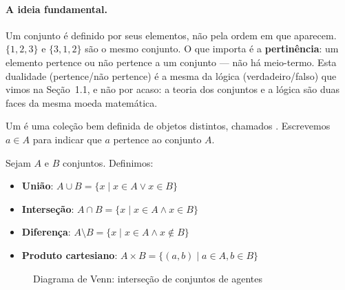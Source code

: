 \paragraph{A ideia fundamental.} Um conjunto é definido por seus elementos,
não pela ordem em que aparecem. $\{1, 2, 3\}$ e $\{3, 1, 2\}$ são o mesmo
conjunto. O que importa é a \textbf{pertinência}: um elemento pertence ou
não pertence a um conjunto --- não há meio-termo. Esta dualidade
(pertence/não pertence) é a mesma da lógica (verdadeiro/falso) que vimos na
Seção~1.1, e não por acaso: a teoria dos conjuntos e a lógica são duas faces
da mesma moeda matemática.

\begin{definicao}[Conjunto]
    Um  é uma coleção bem definida de objetos distintos,
    chamados . Escrevemos $a \in A$ para indicar que
    $a$ pertence ao conjunto $A$.
\end{definicao}

\begin{definicao}
    Sejam $A$ e $B$ conjuntos. Definimos:
    \begin{itemize}
        \item \textbf{União}: $A \cup B = \{x \mid x \in A \lor x \in B\}$
        \item \textbf{Interseção}: $A \cap B = \{x \mid x \in A \land x \in B\}$
        \item \textbf{Diferença}: $A \setminus B = \{x \mid x \in A \land x \notin B\}$
        \item \textbf{Produto cartesiano}: $A \times B = \{(a,b) \mid a \in A, b \in B\}$
    \end{itemize}
\end{definicao}

\begin{figure}[htb]
    \centering
    \caption{Diagrama de Venn: interseção de conjuntos de agentes}
    \label{fig:venn-agentes}
\end{figure}


